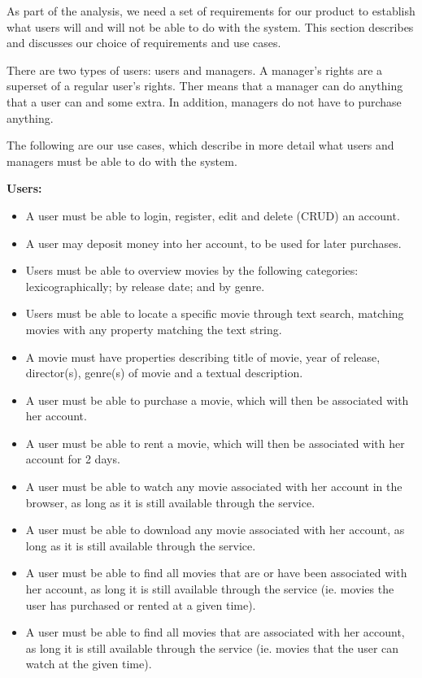 As part of the analysis, we need a set of requirements for our product to establish what users will and will not be able to do with the system. This section describes and discusses our choice of requirements and use cases.


There are two types of users: users and managers. A manager’s rights are a superset of a regular user’s rights. Ther means that a manager can do anything that a user can and some extra. In addition, managers do not have to purchase anything.


The following are our use cases, which describe in more detail what users and managers must be able to do with the system.

\textbf{Users:}
\begin{itemize}
\item A user must be able to login, register, edit and delete (CRUD) an account. \\
\item A user may deposit money into her account, to be used for later purchases. \\
\item Users must be able to overview movies by the following categories: lexicographically; by release date; and by genre. \\
\item Users must be able to locate a specific movie through text search, matching movies with any property matching the text string. \\
\item A movie must have properties describing title of movie, year of release, director(s), genre(s) of movie and a textual description. \\
\item A user must be able to purchase a movie, which will then be associated with her account. \\
\item A user must be able to rent a movie, which will then be associated with her account for 2 days. \\
\item A user must be able to watch any movie associated with her account in the browser, as long as it is still available through the service. \\
\item A user must be able to download any movie associated with her account, as long as it is still available through the service. \\
\item A user must be able to find all movies that are or have been associated with her account, as long it is still available through the service (ie. movies the user has purchased or rented at a given time). \\
\item A user must be able to find all movies that are associated with her account, as long it is still available through the service (ie. movies that the user can watch at the given time). \\
\end{itemize} \\

